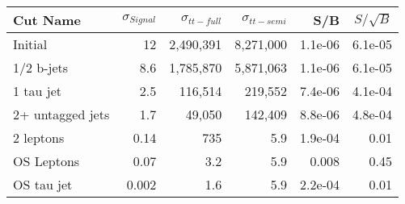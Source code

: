 \begin{tabular}{lrrrrr}
\toprule
         Cut Name &  $\sigma_{Signal}$ &  $\sigma_{tt-full}$ &  $\sigma_{tt-semi}$ &     S/B &  $S/\sqrt{B}$ \\
\midrule
          Initial &                 12 &           2,490,391 &           8,271,000 & 1.1e-06 &       6.1e-05 \\
       1/2 b-jets &                8.6 &           1,785,870 &           5,871,063 & 1.1e-06 &       6.1e-05 \\
        1 tau jet &                2.5 &             116,514 &             219,552 & 7.4e-06 &       4.1e-04 \\
 2+ untagged jets &                1.7 &              49,050 &             142,409 & 8.8e-06 &       4.8e-04 \\
        2 leptons &               0.14 &                 735 &                 5.9 & 1.9e-04 &          0.01 \\
       OS Leptons &               0.07 &                 3.2 &                 5.9 &   0.008 &          0.45 \\
       OS tau jet &              0.002 &                 1.6 &                 5.9 & 2.2e-04 &          0.01 \\
\bottomrule
\end{tabular}
